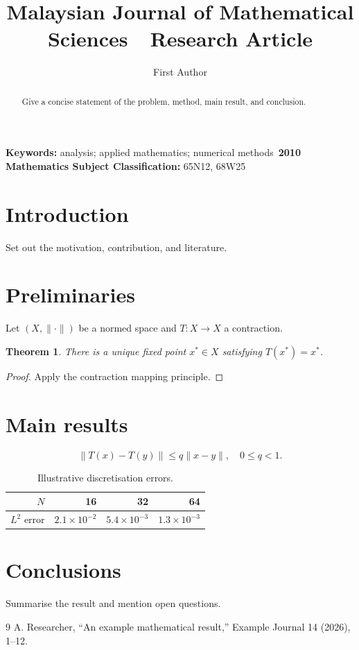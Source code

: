 \documentclass{article}
\title{Malaysian Journal of Mathematical Sciences\ \ Research Article}
\author{First Author}
\date{}
\newtheorem{theorem}{Theorem}[section]
\begin{document}
\maketitle
\begin{abstract}Give a concise statement of the problem, method, main result, and conclusion.\end{abstract}
\noindent\textbf{Keywords:} analysis; applied mathematics; numerical methods\ \textbf{2010 Mathematics Subject Classification:} 65N12, 68W25
\section{Introduction}Set out the motivation, contribution, and literature.
\section{Preliminaries}Let $(X,\|\cdot\|)$ be a normed space and $T:X\to X$ a contraction.
\begin{theorem}There is a unique fixed point $x^*\in X$ satisfying $T(x^*)=x^*$.\end{theorem}
\begin{proof}Apply the contraction mapping principle.\end{proof}
\section{Main results}
\begin{equation}\|T(x)-T(y)\|\leq q\|x-y\|, \quad 0\leq q<1.\end{equation}
\begin{table}[ht]\centering\caption{Illustrative discretisation errors.}
\begin{tabular}{@{}rrrr@{}}\toprule $N$ & 16 & 32 & 64\\\midrule $L^2$ error & $2.1\times10^{-2}$ & $5.4\times10^{-3}$ & $1.3\times10^{-3}$\\\bottomrule\end{tabular}\end{table}
\section{Conclusions}Summarise the result and mention open questions.
\begin{thebibliography}{9} A. Researcher, ``An example mathematical result,'' Example Journal 14 (2026), 1--12.\end{thebibliography}
\end{document}
